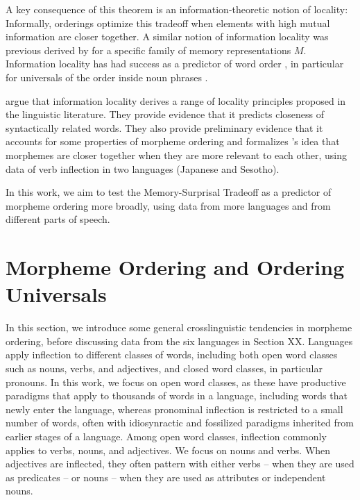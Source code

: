 \documentclass[11pt,letterpaper]{article}
\newcounter{theorem}
\begin{document}
A key consequence of this theorem is an information-theoretic notion of locality:
Informally, orderings optimize this tradeoff when elements with high mutual information are closer together.
A similar notion of information locality was previous derived by \citet{futrell2020lossy} for a specific family of memory representations $M$.
Information locality has had success as a predictor of word order \citep{futrell2019information}, in particular for universals of the order inside noun phrases \citep{culbertson2020from,hahn-information-theoretic-2018,DBLP:conf/acl/FutrellDS20}.

\citet{Hahn2020modeling} argue that information locality derives a range of locality principles proposed in the linguistic literature.
They provide evidence that it predicts closeness of syntactically related words.
They also provide preliminary evidence that it accounts for some properties of morpheme ordering and formalizes \cite{bybee-morphology-1985}'s idea that morphemes are closer together when they are more relevant to each other, using data of verb inflection in two languages (Japanese and Sesotho).

In this work, we aim to test the Memory-Surprisal Tradeoff as a predictor of morpheme ordering more broadly, using data from more languages and from different parts of speech.



\section{Morpheme Ordering and Ordering Universals}

In this section, we introduce some general crosslinguistic tendencies in morpheme ordering, before discussing data from the six languages in Section XX.
Languages apply inflection to different classes of words, including both open word classes such as nouns, verbs, and adjectives, and closed word classes, in particular pronouns.
In this work, we focus on open word classes, as these have productive paradigms that apply to thousands of words in a language, including words that newly enter the language, whereas pronominal inflection is restricted to a small number of words, often with idiosynractic and fossilized paradigms inherited from earlier stages of a language.
Among open word classes, inflection commonly applies to verbs, nouns, and adjectives.
We focus on nouns and verbs.
When adjectives are inflected, they often pattern with either verbs -- when they are used as predicates -- or nouns -- when they are used as attributes or independent nouns.
\end{document}
